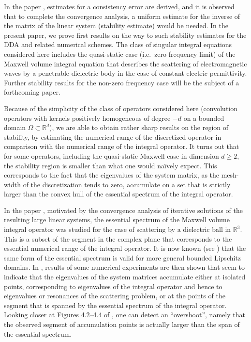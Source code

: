 \documentclass[12pt]{amsart}
\theoremstyle{definition}
\theoremstyle{remark}
\numberwithin{equation}{section}
\newcommand\R{{\mathbb R}}
\begin{document}
In the paper  \cite{Yurkin:06i}, estimates for a consistency error are derived, and it is observed that to complete the convergence analysis, a uniform estimate for the inverse of the matrix of the linear system (stability estimate) would be needed. In the present paper, we prove first results on the way to such stability estimates for the DDA and related numerical schemes. The class of singular integral equations considered here includes the quasi-static case (i.e.\ zero frequency limit) of the Maxwell volume integral equation that describes the scattering of electromagnetic waves by a penetrable dielectric body in the case of constant electric permittivity. Further stability results for the non-zero frequency case will be the subject of a forthcoming paper.

Because of the simplicity of the class of operators considered here (convolution operators with kernels positively homogeneous of degree $-d$ on a bounded domain $\Omega\subset\R^{d}$), we are able to obtain rather sharp results on the region of stability, by estimating the numerical range of the discretized operator in comparison with the numerical range of the integral operator. It turns out that for some operators, including the quasi-static Maxwell case in dimension $d\ge2$, the stability region is smaller than what one would na\"ively expect. 
This corresponds to the fact that the eigenvalues of the system matrix, as the mesh-width of the discretization tends to zero, accumulate on a set that is strictly larger than the convex hull of the essential spectrum of the integral operator.

In the paper \cite{Rahola2000}, motivated by the convergence analysis of iterative solutions of the resulting large linear systems, the essential spectrum of the Maxwell volume integral operator was studied for the case of scattering by a dielectric ball in $\R^{3}$. This is a subset of the segment in the complex plane that corresponds to the essential numerical range of the integral operator. It is now known (see \cite{CoDarSak2012,CoDarSak2015}) that the same form of the essential spectrum is valid for more general bounded Lipschitz domains.
In \cite{Rahola2000}, results of some numerical experiments are then shown that seem to indicate that the eigenvalues of the system matrices accumulate either at isolated points, corresponding to eigenvalues of the integral operator and hence to eigenvalues or resonances of the scattering problem, or at the points of the segment that is spanned by the essential spectrum of the integral operator. Looking closer at Figures 4.2--4.4 of \cite{Rahola2000}, one can detect an ``overshoot'', namely that the observed segment of accumulation points is actually larger than the span of the essential spectrum. 
\end{document}
